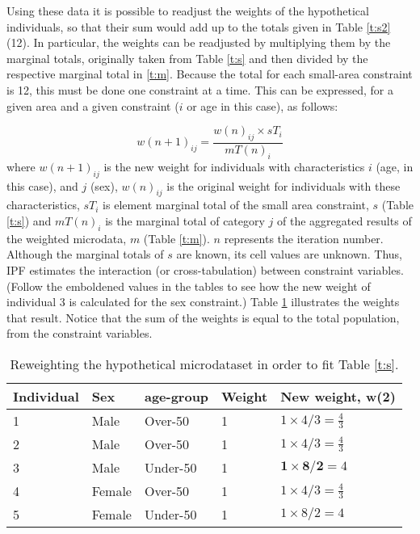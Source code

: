 Using these data it is possible to readjust the weights of the hypothetical
individuals, so that their sum would add up to the totals given in Table
\ref{t:s2} (12). In particular, the weights can be readjusted by multiplying them by
the marginal totals, originally taken from
Table \ref{t:s} and then divided by the respective marginal total in \ref{t:m}.
Because the total for each small-area constraint is 12, this must be
done one constraint at a time. This
can be expressed, for a given area and a given constraint ($i$
or age in this case), as follows:

\begin{equation}
w(n+1)_{ij} = \frac{w(n)_{ij} \times sT_{i}}{mT(n)_{i}}
\label{eq:ipf}
\end{equation}
where $w(n+1)_{ij}$ is the new weight for individuals with characteristics $i$
(age, in this case), and $j$ (sex),  $w(n)_{ij}$ is the original
weight for individuals with these characteristics, $sT_{i}$ is element
marginal total of the small area constraint, $s$
(Table \ref{t:s}) and $mT(n)_{i}$ is the marginal total of category
$j$ of the aggregated results of the weighted
microdata, $m$ (Table \ref{t:m}). $n$ represents the iteration number.
Although the marginal totals of $s$ are known, its cell values
are unknown. Thus, IPF estimates the interaction (or cross-tabulation)
between constraint variables.
(Follow the emboldened values in the tables
to see how the new weight of individual 3 is calculated for the sex constraint.)
Table \ref{t:new-weights} illustrates the weights that result. Notice that the
sum of the weights is equal to the total population, from the constraint variables.

\begin{table}[htbp]
\centering
\caption{Reweighting the hypothetical microdataset in order to fit
Table \ref{t:s}.}
\begin{tabular}{lllll}
\toprule
{Individual} & {Sex} & {age-group} & {Weight} &
{New weight, w(2)} \\ \midrule
1 & Male & Over-50 & 1 & $1 \times 4/3 = \frac{4}{3}$ \\
2 & Male & Over-50 & 1 & $1 \times 4/3 = \frac{4}{3}$ \\
3 & Male & Under-50 & 1 & $\textbf{1} \times
\textbf{8}/\textbf{2} = 4$ \\
4 & Female & Over-50 & 1 & $1 \times 4/3 = \frac{4}{3}$ \\
5 & Female & Under-50 & 1 & $1 \times 8/2 = 4$ \\
\bottomrule
\end{tabular}
\label{t:new-weights}
\end{table}

